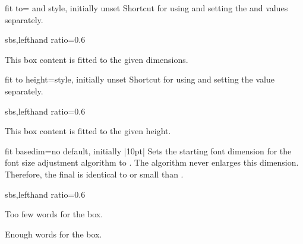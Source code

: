 \clearpage
\begin{docTcbKey}{fit to}{= and }{style, initially unset}
  Shortcut for using  and setting the  and  values
  separately.
\begin{dispExample*}{sbs,lefthand ratio=0.6}

\begin{tcolorbox}[fit to=3cm and 2cm]
  This box content is fitted to the given
  dimensions.
\end{tcolorbox}
\end{dispExample*}
\end{docTcbKey}


\begin{docTcbKey}{fit to height}{=}{style, initially unset}
  Shortcut for using  and setting the  value separately.
\begin{dispExample*}{sbs,lefthand ratio=0.6}

\begin{tcolorbox}[fit to height=2cm]
  This box content is fitted to the given
  height.
\end{tcolorbox}
\end{dispExample*}
\end{docTcbKey}

\begin{docTcbKey}{fit basedim}{=}{no default, initially |10pt|}
  Sets the starting font dimension for the font size adjustment algorithm
  to . The algorithm never enlarges this dimension.
  Therefore, the final  is identical to or small than
  .

\begin{dispExample*}{sbs,lefthand ratio=0.6}

\begin{tcolorbox}[fit to=4cm and 2cm]
  Too few words for the box.
\end{tcolorbox}

\begin{tcolorbox}[fit to=4cm and 2cm,
  fit basedim=50pt]
  Enough words for the box.
\end{tcolorbox}
\end{dispExample*}
\end{docTcbKey}


